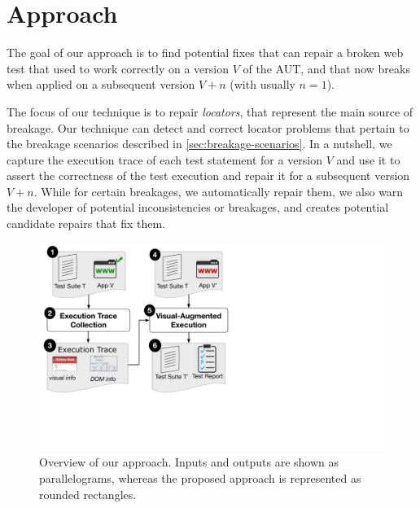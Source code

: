 \section{Approach}\label{sec:approach}

The goal of our approach is to find potential fixes that can repair a broken web test that used to work correctly on a version $V$ of the AUT, and that now breaks when applied on a subsequent version $V+n$ (with usually $n=1$).

The focus of our technique is to repair \textit{locators}, that represent the main source of breakage.
Our technique can detect and correct locator problems that pertain to the breakage scenarios described in \autoref{sec:breakage-scenarios}.
In a nutshell, we capture the execution trace of each test statement for a version $V$ and use it to assert the correctness of the test execution and repair it for a subsequent version $V+n$. While for certain breakages, we automatically repair them, we also warn the developer of potential inconsistencies or breakages, and creates potential candidate repairs that fix them.

\begin{figure}[t]
\centering
\includegraphics[trim={0.2cm 6.5cm 17cm 0.2cm},clip,scale=0.26]{images/approach-bigger}
\caption{Overview of our approach. Inputs and outputs are shown as parallelograms, whereas the proposed approach is represented as rounded rectangles.}
\label{approach}
\end{figure}

